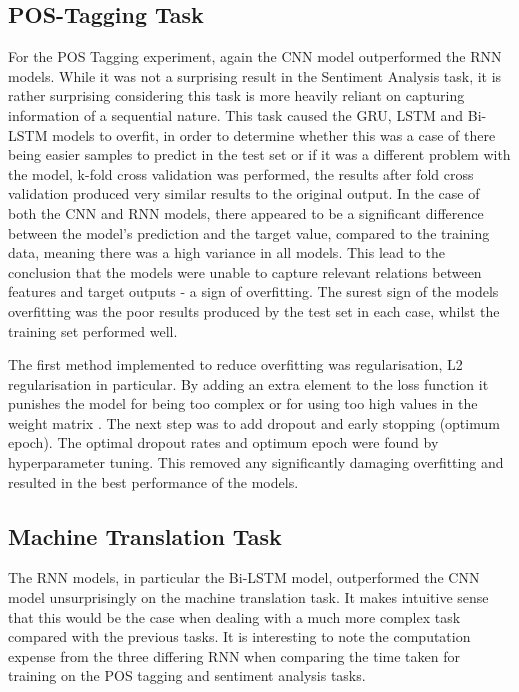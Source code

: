 \documentclass[twocolumn,12pt]{asme2ej}
\begin{document}
\subsection{POS-Tagging Task}
For the POS Tagging experiment, again the CNN model outperformed the RNN models. While it was not a surprising result in the Sentiment Analysis task, it is rather surprising considering this task is more heavily reliant on capturing information of a sequential nature.
This task caused the GRU, LSTM and Bi-LSTM models to overfit, in order to determine whether this was a case of there being easier samples to predict in the test set or if it was a different problem with the model, k-fold cross validation was performed, the results after fold cross validation produced very similar results to the original output. In the case of both the CNN and RNN models, there appeared to be a significant difference between the model’s prediction and the target value, compared to the training data, meaning there was a high variance in all models. This lead to the conclusion that the models were unable to capture relevant relations between features and target outputs - a sign of overfitting. The surest sign of the models overfitting was the poor results produced by the test set in each case, whilst the training set performed well. 

The first method implemented to reduce overfitting was regularisation, L2 regularisation in particular. By adding an extra element to the loss function it punishes the model for being too complex or for using too high values in the weight matrix \cite{PrimerNeuralNetworkModelsforNaturalLanguageProcessin}. The next step was to add dropout and early stopping (optimum epoch). The optimal dropout rates and optimum epoch were found by hyperparameter tuning. This removed any significantly damaging overfitting and resulted in the best performance of the models.


\subsection{Machine Translation Task}
The RNN models, in particular the Bi-LSTM model, outperformed the CNN model unsurprisingly on the machine translation task. It makes intuitive sense that this would be the case when dealing with a much more complex task compared with the previous tasks. It is interesting to note the computation expense from the three differing RNN when comparing the time taken for training on the POS tagging and sentiment analysis tasks. 
\end{document}
